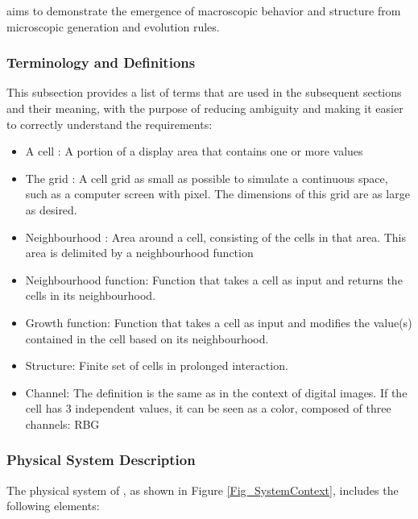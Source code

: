 \documentclass[12pt]{article}
\begin{document}
\progname{} aims to demonstrate the emergence of macroscopic behavior and structure from microscopic generation and evolution rules.

\subsubsection{Terminology and  Definitions}

This subsection provides a list of terms that are used in the subsequent
sections and their meaning, with the purpose of reducing ambiguity and making it
easier to correctly understand the requirements:

\begin{itemize}

\item A cell : A portion of a display area that contains one or more values

\item The grid : A cell grid as small as possible to simulate a continuous space, such as a computer screen with pixel. The dimensions of this grid are as large as desired.

\item Neighbourhood : Area around a cell, consisting of the cells in that area. This area is delimited by a neighbourhood function

\item Neighbourhood function: Function that takes a cell as input and returns the cells in its neighbourhood.

\item Growth function: Function that takes a cell as input and modifies the value(s) contained in the cell based on its neighbourhood.

\item Structure: Finite set of cells in prolonged interaction.

\item Channel: The definition is the same as in the context of digital images. If the cell has 3 independent values, it can be seen as a color, composed of three channels: RBG


\end{itemize}

\subsubsection{Physical System Description} \label{sec_phySystDescrip}

The physical system of \progname{}, as shown in Figure \ref{Fig_SystemContext}, includes the following elements:
\end{document}
